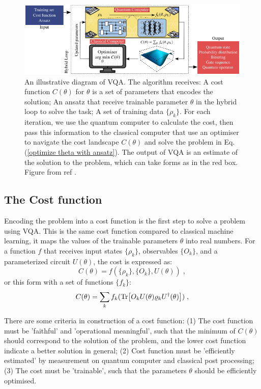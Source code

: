 \begin{figure}
    \centering
    \includegraphics[width=\textwidth]{LiteratureReview/Appendices/vqadiagram.png}
    \caption{
    An illustrative diagram of VQA. The algorithm receives: 
    A cost function $C(\theta)$ for $\theta$ is a set of parameters that encodes the solution; 
    An ansatz that receive trainable parameter $\theta$ in the hybrid loop to solve the task;
    A set of training data $\{\rho_k\}$.
    For each iteration, we use the quantum computer to calculate the cost, then pass this information to the classical computer that use an optimiser to navigate the cost landscape $C(\theta)$ and solve the problem in Eq. (\ref{optimize theta with ansatz}).
    The output of VQA is an estimate of the solution to the problem, which can take forms as in the red box.
    Figure from ref \cite{cerezo2021variational}.
    }
    \label{VQA diagram}
\end{figure}

\subsection{The Cost function}
Encoding the problem into a cost function is the first step to solve a problem using VQA.
This is the same cost function compared to classical machine learning, it maps the values of the trainable parameters $\theta$ into real numbers.
For a function $f$ that receives input states $\{\rho_k\}$, observables $\{O_k\}$, and a parameterized circuit $U(\theta)$, the cost is expressed as:
\begin{equation}
    C(\theta) = f(\{\rho_k\}, \{O_k\}, U(\theta)) \;,
\end{equation}
or this form with a set of functions $\{ f_k \}$:
\begin{equation}
    C(\theta) = \sum_k f_k(\Tr[ O_k U(\theta) \varrho_k U^\dagger(\theta) ]) \;,
    \label{Cost function}
\end{equation}

There are some criteria in construction of a cost function: 
(1) The cost function must be 'faithful' and 'operational meaningful', such that the minimum of $C(\theta)$ should correspond to the solution of the problem, and the lower cost function indicate a better solution in general;
(2) Cost function must be 'efficiently estimated' by measurement on quantum computer and classical post processing;
(3) The cost must be 'trainable', such that the parameters $\theta$ should be efficiently optimised.

